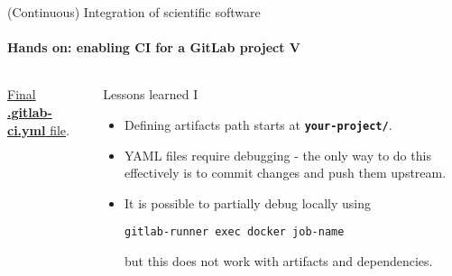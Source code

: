 \begin{frame}[fragile]{(Continuous) Integration of scientific software} 
    \framesubtitle{Hands on: enabling CI for a GitLab project V} 
    \vfill

    \begin{columns}
        \begin{column}[c]{0.5\textwidth}
    \href{https://gitlab.com/tmaric/minimal-cse-ci-examples/-/blob/01-with-ci/.gitlab-ci.yml}{Final \textbf{.gitlab-ci.yml} file}. 
        \end{column}
        \begin{column}[c]{0.5\textwidth}
            Lessons learned I
            \begin{itemize}
                \item Defining artifacts path starts at \textbf{\texttt{your-project/}}.
                \item YAML files require debugging - the only way to do this effectively is to commit changes and push them upstream.
                \item It is possible to partially debug locally using 
                    \begin{verbatim}
gitlab-runner exec docker job-name
                    \end{verbatim}
                    but this does not work with artifacts and dependencies.
            \end{itemize}
        \end{column}
    \end{columns}

\end{frame}


